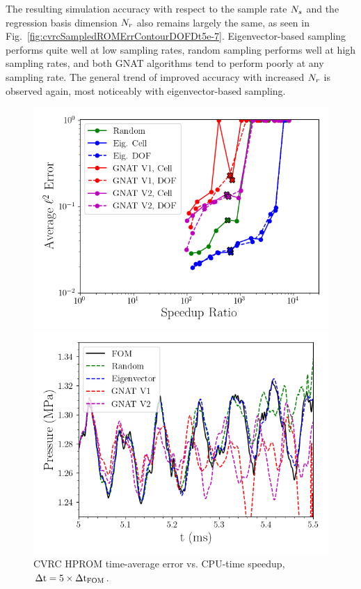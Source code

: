 The resulting simulation accuracy with respect to the sample rate $N_s$ and the regression basis dimension $N_r$ also remains largely the same, as seen in Fig.~\ref{fig:cvrcSampledROMErrContourDOFDt5e-7}. Eigenvector-based sampling performs quite well at low sampling rates, random sampling performs well at high sampling rates, and both GNAT algorithms tend to perform poorly at any sampling rate. The general trend of improved accuracy with increased $N_r$ is observed again, most noticeably with eigenvector-based sampling.

\begin{figure}
	\begin{minipage}{0.49\linewidth}
		\includegraphics[width=0.99\linewidth]{Chapters/HPROMResults/Images/cvrc/dof_samp/sampled_dt5e-7_Average_errorRaw_pareto.png}
		\caption{\label{fig:cvrcSampledROMErrVsTimeDOF}CVRC HPROM time-average error vs. CPU-time speedup, $\Delta \text{t} = 5 \times \Delta \text{t}_{\text{FOM}}$.}
	\end{minipage}
	\begin{minipage}{0.49\linewidth}
		\includegraphics[width=0.99\linewidth]{Chapters/HPROMResults/Images/cvrc/dof_samp/pressure_probe_deim_dof_dt5e-7_samp0p0025.png}

\end{minipage}
\end{figure}
